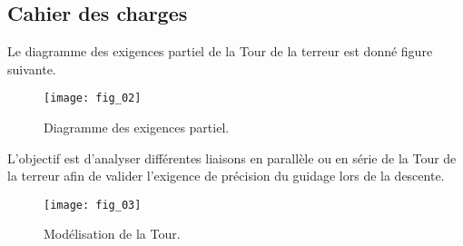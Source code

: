 \subsection*{Cahier des charges\\}

Le diagramme des exigences partiel de la Tour de la terreur est donné figure suivante.


\begin{figure}[!h]
\centering
\texttt{[image: fig\_02]}

\caption{Diagramme des exigences partiel.}
\end{figure}

%

\begin{obj}
L'objectif est d'analyser différentes liaisons en parallèle ou en série de la Tour de la terreur afin de valider l'exigence de précision du guidage lors de la descente.
\end{obj}




\begin{figure}[!h]
\centering
\texttt{[image: fig\_03]}

\caption{Modélisation de la Tour.}
\end{figure}

%
%
%

